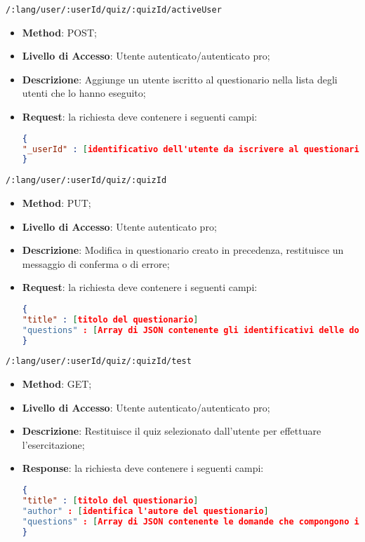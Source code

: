 	\item \texttt{/:lang/user/:userId/quiz/:quizId/activeUser}
	\begin{itemize}
		\item \textbf{Method}: POST;
		\item \textbf{Livello di Accesso}: Utente autenticato/autenticato pro;
		\item \textbf{Descrizione}: Aggiunge un utente iscritto al questionario nella lista degli utenti che lo hanno eseguito;
		\item \textbf{Request}: la richiesta deve contenere i seguenti campi:
\begin{lstlisting}[language=json,firstnumber=1]
{
"_userId" : [identificativo dell'utente da iscrivere al questionario]
}
\end{lstlisting}
	\end{itemize}
	
	\item \texttt{/:lang/user/:userId/quiz/:quizId}
	\begin{itemize}
		\item \textbf{Method}: PUT;
		\item \textbf{Livello di Accesso}: Utente autenticato pro;
		\item \textbf{Descrizione}: Modifica in questionario creato in precedenza, restituisce un messaggio di conferma o di errore;
		\item \textbf{Request}: la richiesta deve contenere i seguenti campi:
\begin{lstlisting}[language=json,firstnumber=1]
{
"title" : [titolo del questionario]
"questions" : [Array di JSON contenente gli identificativi delle domande che compongono il questionario]
}
\end{lstlisting}
	\end{itemize}
	
	\item \texttt{/:lang/user/:userId/quiz/:quizId/test}
	\begin{itemize}
		\item \textbf{Method}: GET;
		\item \textbf{Livello di Accesso}: Utente autenticato/autenticato pro;
		\item \textbf{Descrizione}: Restituisce il quiz selezionato dall'utente per effettuare l'esercitazione;
		\item \textbf{Response}: la richiesta deve contenere i seguenti campi:
\begin{lstlisting}[language=json,firstnumber=1]
{
"title" : [titolo del questionario]
"author" : [identifica l'autore del questionario]
"questions" : [Array di JSON contenente le domande che compongono il questionario]
}
\end{lstlisting}
	\end{itemize}
	
